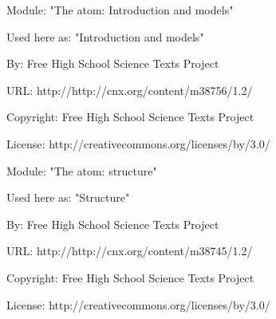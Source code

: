       \par\vspace{9pt}\noindent\begin{minipage}{\textwidth}
      Module: "The atom: Introduction and models" \par\nopagebreak\noindent
      Used here as: "Introduction and models" \par\nopagebreak\noindent
        By: Free High School Science Texts Project\par\nopagebreak\noindent
      URL: http://http://cnx.org/content/m38756/1.2/\par\nopagebreak\noindent
      \par\nopagebreak\noindent
      Copyright: Free High School Science Texts Project\par\nopagebreak\noindent
      License:  http://creativecommons.org/licenses/by/3.0/\par\nopagebreak\noindent
      \par\end{minipage}
      \par\vspace{9pt}\noindent\begin{minipage}{\textwidth}
      Module: "The atom: structure" \par\nopagebreak\noindent
      Used here as: "Structure" \par\nopagebreak\noindent
        By: Free High School Science Texts Project\par\nopagebreak\noindent
      URL: http://http://cnx.org/content/m38745/1.2/\par\nopagebreak\noindent
      \par\nopagebreak\noindent
      Copyright: Free High School Science Texts Project\par\nopagebreak\noindent
      License:  http://creativecommons.org/licenses/by/3.0/\par\nopagebreak\noindent
      \par\end{minipage}
